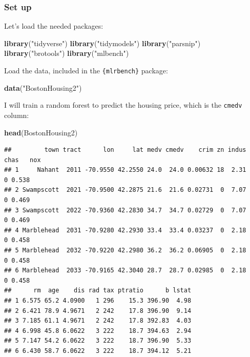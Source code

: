 \documentclass[]{gitbook}
\newenvironment{Shaded}{\begin{snugshade}}{\end{snugshade}}
\newcommand{\KeywordTok}[1]{\textcolor[rgb]{0.13,0.29,0.53}{\textbf{#1}}}
\newcommand{\NormalTok}[1]{#1}
\newcommand{\StringTok}[1]{\textcolor[rgb]{0.31,0.60,0.02}{#1}}
\begin{document}
\hypertarget{set-up}{%
\subsubsection{Set up}\label{set-up}}

Let's load the needed packages:

\begin{Shaded}
\begin{Highlighting}[]
\KeywordTok{library}\NormalTok{(}\StringTok{"tidyverse"}\NormalTok{)}
\KeywordTok{library}\NormalTok{(}\StringTok{"tidymodels"}\NormalTok{)}
\KeywordTok{library}\NormalTok{(}\StringTok{"parsnip"}\NormalTok{)}
\KeywordTok{library}\NormalTok{(}\StringTok{"brotools"}\NormalTok{)}
\KeywordTok{library}\NormalTok{(}\StringTok{"mlbench"}\NormalTok{)}
\end{Highlighting}
\end{Shaded}

Load the data, included in the \texttt{\{mlrbench\}} package:

\begin{Shaded}
\begin{Highlighting}[]
\KeywordTok{data}\NormalTok{(}\StringTok{"BostonHousing2"}\NormalTok{)}
\end{Highlighting}
\end{Shaded}

I will train a random forest to predict the housing price, which is the \texttt{cmedv} column:

\begin{Shaded}
\begin{Highlighting}[]
\KeywordTok{head}\NormalTok{(BostonHousing2)}
\end{Highlighting}
\end{Shaded}

\begin{verbatim}
##         town tract      lon     lat medv cmedv    crim zn indus chas   nox
## 1     Nahant  2011 -70.9550 42.2550 24.0  24.0 0.00632 18  2.31    0 0.538
## 2 Swampscott  2021 -70.9500 42.2875 21.6  21.6 0.02731  0  7.07    0 0.469
## 3 Swampscott  2022 -70.9360 42.2830 34.7  34.7 0.02729  0  7.07    0 0.469
## 4 Marblehead  2031 -70.9280 42.2930 33.4  33.4 0.03237  0  2.18    0 0.458
## 5 Marblehead  2032 -70.9220 42.2980 36.2  36.2 0.06905  0  2.18    0 0.458
## 6 Marblehead  2033 -70.9165 42.3040 28.7  28.7 0.02985  0  2.18    0 0.458
##      rm  age    dis rad tax ptratio      b lstat
## 1 6.575 65.2 4.0900   1 296    15.3 396.90  4.98
## 2 6.421 78.9 4.9671   2 242    17.8 396.90  9.14
## 3 7.185 61.1 4.9671   2 242    17.8 392.83  4.03
## 4 6.998 45.8 6.0622   3 222    18.7 394.63  2.94
## 5 7.147 54.2 6.0622   3 222    18.7 396.90  5.33
## 6 6.430 58.7 6.0622   3 222    18.7 394.12  5.21
\end{verbatim}
\end{document}
